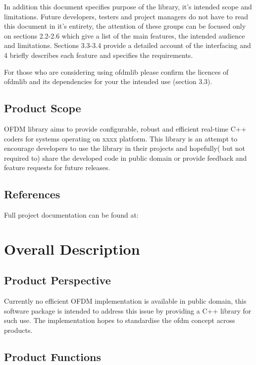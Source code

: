 \documentclass[]{report}
\begin{document}
In addition this document specifies purpose of the library, it's intended scope and limitations. Future developers, testers and project managers do not have to read this document in it's entirety, the attention of these groups can be focused only on sections 2.2-2.6 which give a list of the main features, the intended audience and limitations. Sections 3.3-3.4 provide a detailed account of the interfacing and 4 briefly describes each feature and specifies the requirements.

For those who are considering using ofdmlib please confirm the licences of ofdmlib and its dependencies for your the intended use (section 3.3).


\subsection{Product Scope}

OFDM library aims to provide configurable, robust and efficient real-time C++ coders for systems operating on xxxx platform. This library is an attempt to encourage developers to use the library in their projects and hopefully( but not required to) share the developed code in public domain or provide feedback and feature requests for future releases.

\subsection{References}

Full project documentation can be found at: 

\pagebreak
\section{Overall Description}

\subsection{Product Perspective}

Currently no efficient OFDM implementation is available in public domain, this software package is intended to address this issue by providing a C++ library for such use. The implementation hopes to standardise the ofdm concept across products. 


\subsection{Product Functions}
\end{document}
